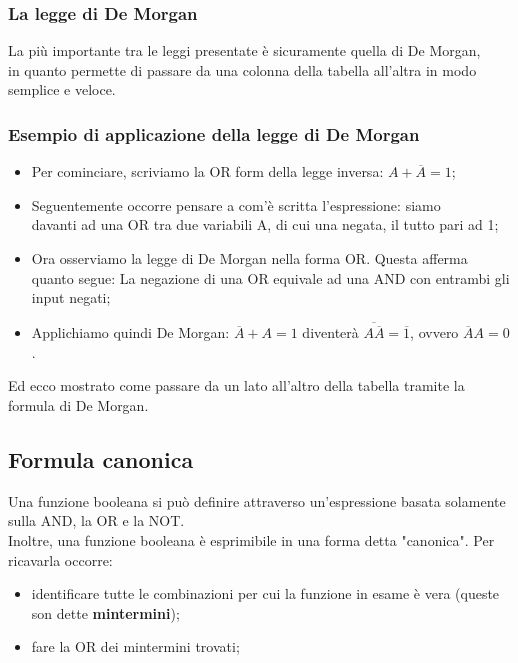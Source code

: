 \documentclass[12pt]{article}
\begin{document}
\subsubsection{La legge di De Morgan}
La più importante tra le leggi presentate è sicuramente quella di De Morgan,\\
in quanto permette di passare da una colonna della tabella all'altra in modo semplice e veloce.
\subsubsection{Esempio di applicazione della legge di De Morgan}
\begin{itemize}
    \item Per cominciare, scriviamo la OR form della legge inversa: $A + \overline{A} = 1$;
    \item Seguentemente occorre pensare a com'è scritta l'espressione: siamo\\davanti ad una OR tra due variabili A, di cui una negata, il tutto pari ad 1;
    \item Ora osserviamo la legge di De Morgan nella forma OR. Questa afferma quanto segue: La negazione di una OR equivale ad una AND con entrambi gli input negati;
    \item Applichiamo quindi De Morgan: $\overline{A} + A = 1$ diventerà $\overline{A\overline{A}} = \overline{1}$, ovvero $\overline{A}A = 0$.
\end{itemize}
Ed ecco mostrato come passare da un lato all'altro della tabella tramite la formula di De Morgan.
\subsection{Formula canonica}
Una funzione booleana si può definire attraverso un'espressione basata solamente sulla AND, la OR e la NOT.\\
Inoltre, una funzione booleana è esprimibile in una forma detta "canonica". Per ricavarla occorre:
\begin{itemize}
    \item identificare tutte le combinazioni per cui la funzione in esame è vera (queste son dette \textbf{mintermini});
    \item fare la OR dei mintermini trovati;
\end{itemize}
\pagebreak
\end{document}
